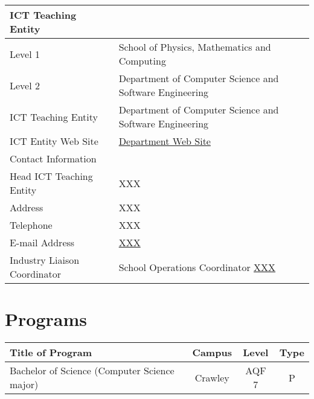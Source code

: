 \begin{centering}
\begin{tabular}{l l}\hline
\toprule
ICT Teaching Entity & \\ \midrule
Level 1	&   School of Physics, Mathematics and Computing\\
Level 2 & Department of Computer Science and Software Engineering\\ 
ICT Teaching Entity	& Department of Computer Science and Software Engineering\\
ICT Entity Web Site &	\href{}{Department Web Site}\\ \midrule
Contact Information & \\ \midrule
Head ICT Teaching Entity & XXX \\
Address	& XXX\\
Telephone &	XXX\\
E-mail Address	& 
\href{mailto:XXX}{XXX}\\ %

Industry Liaison Coordinator & School Operations Coordinator \href{mailto:XXX}{XXX}\\

\bottomrule
\end{tabular}
\end{centering}

\section{Programs}

\begin{centering}
\begin{tabular}{ P{9cm} ccc}\hline
\toprule
{\bf Title of Program}  & {\bf Campus}  & {\bf Level} & {\bf Type} \\ 
\midrule
Bachelor of Science (Computer Science major) & Crawley & AQF 7 & P    \\ %
\bottomrule
\end{tabular}
\end{centering}


